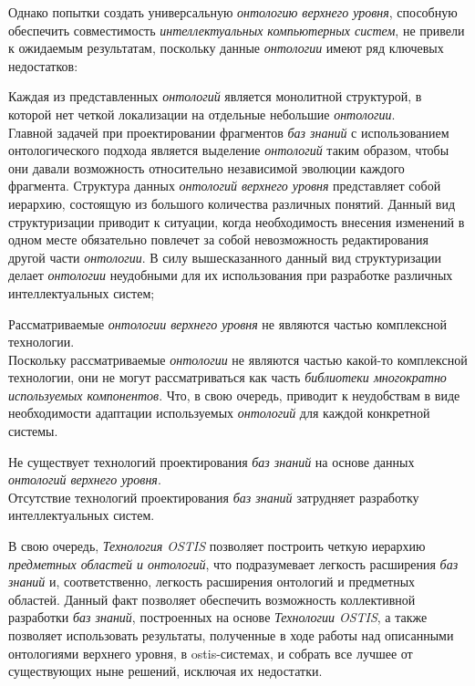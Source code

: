 Однако попытки создать универсальную \textit{онтологию верхнего уровня}, способную обеспечить совместимость \textit{интеллектуальных компьютерных систем}, не привели к ожидаемым результатам, поскольку данные \textit{онтологии} имеют ряд ключевых недостатков:
\begin{textitemize}
	\item Каждая из представленных \textit{онтологий} является монолитной структурой, в которой нет четкой локализации на отдельные небольшие \textit{онтологии}. \\
	Главной задачей при проектировании фрагментов \textit{баз знаний} с использованием онтологического подхода является выделение \textit{онтологий} таким образом, чтобы они давали возможность относительно независимой эволюции каждого фрагмента. Структура данных \textit{онтологий верхнего уровня} представляет собой иерархию, состоящую из большого количества различных понятий. Данный вид структуризации приводит к ситуации, когда необходимость внесения изменений в одном месте обязательно повлечет за собой невозможность редактирования другой части \textit{онтологии}. В силу вышесказанного данный вид структуризации делает \textit{онтологии} неудобными для их использования при разработке различных интеллектуальных систем;
	\item Рассматриваемые \textit{онтологии верхнего уровня} не являются частью комплексной технологии.\\
	Поскольку рассматриваемые \textit{онтологии} не являются частью какой-то комплексной технологии, они не могут рассматриваться как часть \textit{библиотеки многократно используемых компонентов}. Что, в свою очередь, приводит к неудобствам в виде необходимости адаптации используемых \textit{онтологий} для каждой конкретной системы.
	\item Не существует технологий проектирования \textit{баз знаний} на основе данных \textit{онтологий верхнего уровня}.\\
	Отсутствие технологий проектирования \textit{баз знаний} затрудняет разработку интеллектуальных систем. 
\end{textitemize}

В свою очередь, \textit{Технология OSTIS} позволяет построить четкую иерархию \textit{предметных областей и онтологий}, что подразумевает легкость расширения \textit{баз знаний} и, соответственно, легкость расширения онтологий и предметных областей. Данный факт позволяет обеспечить возможность коллективной разработки \textit{баз знаний}, построенных на основе \textit{Технологии OSTIS}, а также позволяет использовать результаты, полученные в ходе работы над описанными онтологиями верхнего уровня, в ostis-системах, и собрать все лучшее от существующих ныне решений, исключая их недостатки.

